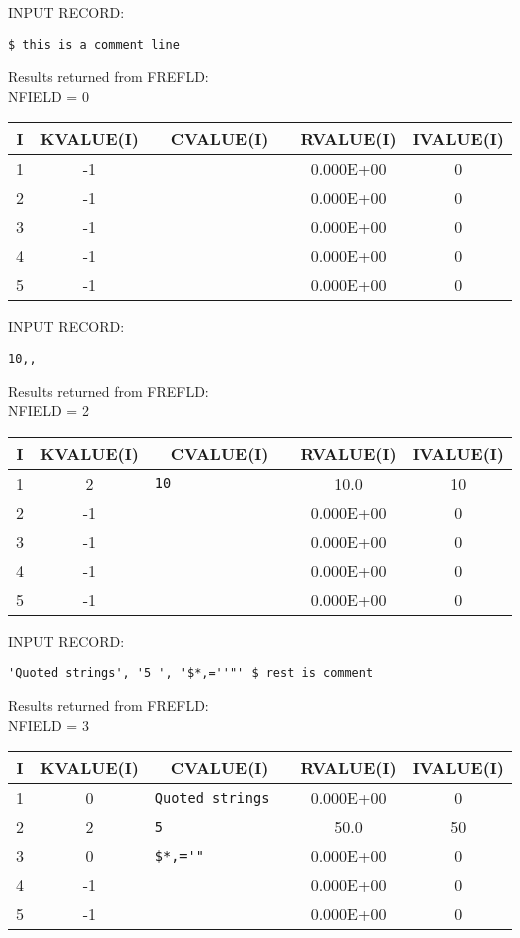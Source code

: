 INPUT RECORD:
\begin{verbatim}
$ this is a comment line
\end{verbatim}

Results returned from FREFLD:\\
NFIELD = 0

\begin{tabular}{|ccccc|} \hline \hline
I    &  KVALUE(I)  &      CVALUE(I)    &     RVALUE(I) &    IVALUE(I)\\\hline
1 &-1 &\verb*"                "  &    0.000E+00 & 0\\
2 &-1 &\verb*"                "  &    0.000E+00 & 0\\
3 &-1 &\verb*"                "  &    0.000E+00 & 0\\
4 &-1 &\verb*"                "  &    0.000E+00 & 0\\
5 &-1 &\verb*"                "  &    0.000E+00 & 0\\ \hline \hline
\end{tabular}

INPUT RECORD:
\begin{verbatim}
10,,
\end{verbatim}

Results returned from FREFLD:\\
NFIELD =    2

\begin{tabular}{|ccccc|} \hline \hline
I    &  KVALUE(I) &       CVALUE(I)       &   RVALUE(I)   &  IVALUE(I)\\\hline
1  &  2  &\verb*"10              "  &     10.0     &  10\\
2  & -1  &\verb*"                "  &    0.000E+00 &  0\\
3  & -1  &\verb*"                "  &    0.000E+00 &  0\\
4  & -1  &\verb*"                "  &    0.000E+00 &  0\\
5  & -1  &\verb*"                "  &    0.000E+00 &  0\\ \hline \hline
\end{tabular}

INPUT RECORD:
\begin{verbatim}
'Quoted strings', '5 ', '$*,=''"' $ rest is comment
\end{verbatim}

Results returned from FREFLD:\\
NFIELD =    3

\begin{tabular}{|ccccc|} \hline \hline
I    &  KVALUE(I) &       CVALUE(I)       &   RVALUE(I)   &  IVALUE(I)\\\hline
1  &  0  &\verb*"Quoted strings  "  &    0.000E+00 &  0\\
2  &  2  &\verb*"5               "  &     50.0     &  50\\
3  &  0  &\verb*+$*,='"          +  &    0.000E+00 &  0\\
4  & -1  &\verb*"                "  &    0.000E+00 &  0\\
5  & -1  &\verb*"                "  &    0.000E+00 &  0\\ \hline \hline
\end{tabular}

